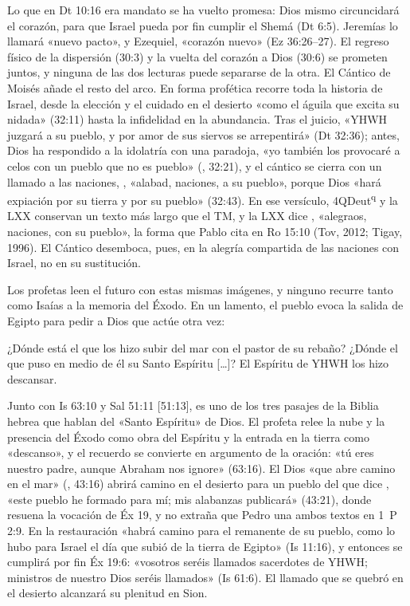 Lo que en Dt 10:16 era mandato se ha vuelto promesa: Dios mismo circuncidará el corazón, para que Israel pueda por fin cumplir el Shemá (Dt 6:5). Jeremías lo llamará «nuevo pacto», y Ezequiel, «corazón nuevo» (Ez 36:26–27). El regreso físico de la dispersión (30:3) y la vuelta del corazón a Dios (30:6) se prometen juntos, y ninguna de las dos lecturas puede separarse de la otra. El Cántico de Moisés añade el resto del arco. En forma profética recorre toda la historia de Israel, desde la elección y el cuidado en el desierto «como el águila que excita su nidada» (32:11) hasta la infidelidad en la abundancia. Tras el juicio, «YHWH juzgará a su pueblo, y por amor de sus siervos se arrepentirá» (Dt 32:36); antes, Dios ha respondido a la idolatría con una paradoja, «yo también los provocaré a celos con un pueblo que no es pueblo» (, 32:21), y el cántico se cierra con un llamado a las naciones, , «alabad, naciones, a su pueblo», porque Dios «hará expiación por su tierra y por su pueblo» (32:43). En ese versículo, 4QDeut\textsuperscript{q} y la LXX conservan un texto más largo que el TM, y la LXX dice , «alegraos, naciones, con su pueblo», la forma que Pablo cita en Ro 15:10 (Tov, 2012; Tigay, 1996). El Cántico desemboca, pues, en la alegría compartida de las naciones con Israel, no en su sustitución.

Los profetas leen el futuro con estas mismas imágenes, y ninguno recurre tanto como Isaías a la memoria del Éxodo. En un lamento, el pueblo evoca la salida de Egipto para pedir a Dios que actúe otra vez:

\begin{cita}¿Dónde está el que los hizo subir del mar con el pastor de su rebaño? ¿Dónde el que puso en medio de él su Santo Espíritu [\ldots]? El Espíritu de YHWH los hizo descansar.\end{cita}

Junto con Is 63:10 y Sal 51:11 [51:13], es uno de los tres pasajes de la Biblia hebrea que hablan del «Santo Espíritu» de Dios. El profeta relee la nube y la presencia del Éxodo como obra del Espíritu y la entrada en la tierra como «descanso», y el recuerdo se convierte en argumento de la oración: «tú eres nuestro padre, aunque Abraham nos ignore» (63:16). El Dios «que abre camino en el mar» (, 43:16) abrirá camino en el desierto para un pueblo del que dice , «este pueblo he formado para mí; mis alabanzas publicará» (43:21), donde resuena la vocación de Éx 19, y no extraña que Pedro una ambos textos en 1~P 2:9. En la restauración «habrá camino para el remanente de su pueblo, como lo hubo para Israel el día que subió de la tierra de Egipto» (Is 11:16), y entonces se cumplirá por fin Éx 19:6: «vosotros seréis llamados sacerdotes de YHWH; ministros de nuestro Dios seréis llamados» (Is 61:6). El llamado que se quebró en el desierto alcanzará su plenitud en Sion.

